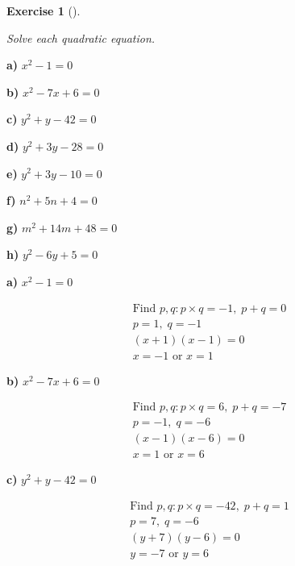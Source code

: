 \documentclass[
  letterpaper,
  DIV=11,
  numbers=noendperiod]{scrreprt}
\theoremstyle{definition}
\newtheorem{exercise}{Exercise}[chapter]
\theoremstyle{remark}
\begin{document}
\begin{exercise}[]\protect\hypertarget{exr-u6-8}{}\label{exr-u6-8}

\emph{Solve each quadratic equation.}

\textbf{a)} \(\displaystyle x^2 - 1 = 0\)

\textbf{b)} \(\displaystyle x^2 - 7x + 6 = 0\)

\textbf{c)} \(\displaystyle y^2 + y - 42 = 0\)

\textbf{d)} \(\displaystyle y^2 + 3y - 28 = 0\)

\textbf{e)} \(\displaystyle y^2 + 3y - 10 = 0\)

\textbf{f)} \(\displaystyle n^2 + 5n + 4 = 0\)

\textbf{g)} \(\displaystyle m^2 + 14m + 48 = 0\)

\textbf{h)} \(\displaystyle y^2 - 6y + 5 = 0\)

\begin{tcolorbox}[enhanced jigsaw, opacitybacktitle=0.6, coltitle=black, arc=.35mm, colframe=quarto-callout-tip-color-frame, colback=white, bottomrule=.15mm, left=2mm, colbacktitle=quarto-callout-tip-color!10!white, titlerule=0mm, opacityback=0, title=\textcolor{quarto-callout-tip-color}{\faLightbulb}\hspace{0.5em}{🔍 View Solutions}, leftrule=.75mm, breakable, rightrule=.15mm, bottomtitle=1mm, toptitle=1mm, toprule=.15mm]

\textbf{a)} \(\displaystyle x^2 - 1 = 0\)

\begin{align*}
\text{Find } p, q: p \times q = -1,\; p + q = 0 \\ p = 1,\; q = -1 \\ (x + 1)(x - 1) = 0 \\ x = -1 \text{ or } x = 1
\end{align*}

\textbf{b)} \(\displaystyle x^2 - 7x + 6 = 0\)

\begin{align*}
\text{Find } p, q: p \times q = 6,\; p + q = -7 \\ p = -1,\; q = -6 \\ (x - 1)(x - 6) = 0 \\ x = 1 \text{ or } x = 6
\end{align*}

\textbf{c)} \(\displaystyle y^2 + y - 42 = 0\)

\begin{align*}
\text{Find } p, q: p \times q = -42,\; p + q = 1 \\ p = 7,\; q = -6 \\ (y + 7)(y - 6) = 0 \\ y = -7 \text{ or } y = 6
\end{align*}


\end{tcolorbox}
\end{exercise}
\end{document}
